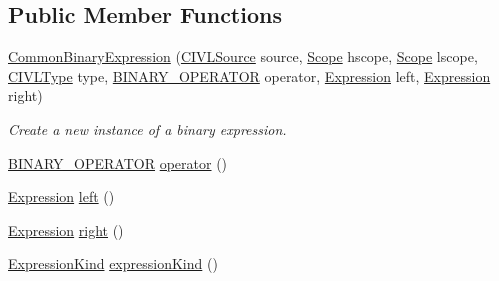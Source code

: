 \subsection*{Public Member Functions}
\begin{DoxyCompactItemize}
\item 
\hyperlink{classedu_1_1udel_1_1cis_1_1vsl_1_1civl_1_1model_1_1common_1_1expression_1_1CommonBinaryExpression_a5c9e8e7370a553249b69d09e492d4f0a}{Common\+Binary\+Expression} (\hyperlink{interfaceedu_1_1udel_1_1cis_1_1vsl_1_1civl_1_1model_1_1IF_1_1CIVLSource}{C\+I\+V\+L\+Source} source, \hyperlink{interfaceedu_1_1udel_1_1cis_1_1vsl_1_1civl_1_1model_1_1IF_1_1Scope}{Scope} hscope, \hyperlink{interfaceedu_1_1udel_1_1cis_1_1vsl_1_1civl_1_1model_1_1IF_1_1Scope}{Scope} lscope, \hyperlink{interfaceedu_1_1udel_1_1cis_1_1vsl_1_1civl_1_1model_1_1IF_1_1type_1_1CIVLType}{C\+I\+V\+L\+Type} type, \hyperlink{enumedu_1_1udel_1_1cis_1_1vsl_1_1civl_1_1model_1_1IF_1_1expression_1_1BinaryExpression_1_1BINARY__OPERATOR}{B\+I\+N\+A\+R\+Y\+\_\+\+O\+P\+E\+R\+A\+T\+O\+R} operator, \hyperlink{interfaceedu_1_1udel_1_1cis_1_1vsl_1_1civl_1_1model_1_1IF_1_1expression_1_1Expression}{Expression} left, \hyperlink{interfaceedu_1_1udel_1_1cis_1_1vsl_1_1civl_1_1model_1_1IF_1_1expression_1_1Expression}{Expression} right)
\begin{DoxyCompactList}\small\item\em Create a new instance of a binary expression. \end{DoxyCompactList}\item 
\hyperlink{enumedu_1_1udel_1_1cis_1_1vsl_1_1civl_1_1model_1_1IF_1_1expression_1_1BinaryExpression_1_1BINARY__OPERATOR}{B\+I\+N\+A\+R\+Y\+\_\+\+O\+P\+E\+R\+A\+T\+O\+R} \hyperlink{classedu_1_1udel_1_1cis_1_1vsl_1_1civl_1_1model_1_1common_1_1expression_1_1CommonBinaryExpression_afc929e1d74f5288e1fa2e39c5decacb3}{operator} ()
\item 
\hyperlink{interfaceedu_1_1udel_1_1cis_1_1vsl_1_1civl_1_1model_1_1IF_1_1expression_1_1Expression}{Expression} \hyperlink{classedu_1_1udel_1_1cis_1_1vsl_1_1civl_1_1model_1_1common_1_1expression_1_1CommonBinaryExpression_a52387050504ffa8670668792ba148b2f}{left} ()
\item 
\hyperlink{interfaceedu_1_1udel_1_1cis_1_1vsl_1_1civl_1_1model_1_1IF_1_1expression_1_1Expression}{Expression} \hyperlink{classedu_1_1udel_1_1cis_1_1vsl_1_1civl_1_1model_1_1common_1_1expression_1_1CommonBinaryExpression_ac2628741901ed3e619ac89b02fecf57b}{right} ()
\item 
\hyperlink{enumedu_1_1udel_1_1cis_1_1vsl_1_1civl_1_1model_1_1IF_1_1expression_1_1Expression_1_1ExpressionKind}{Expression\+Kind} \hyperlink{classedu_1_1udel_1_1cis_1_1vsl_1_1civl_1_1model_1_1common_1_1expression_1_1CommonBinaryExpression_a326f47b64ac5dbb8ebf847701d9f7a1c}{expression\+Kind} ()

\end{DoxyCompactItemize}
